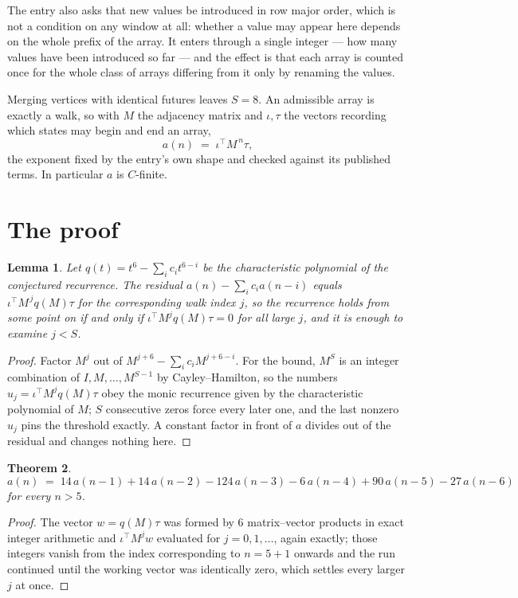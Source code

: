 \documentclass[11pt,a4paper]{article}
\theoremstyle{plain}
\newtheorem{theorem}{Theorem}
\newtheorem{lemma}[theorem]{Lemma}
\theoremstyle{definition}
\begin{document}
The entry also asks that new values be introduced in row major order, which is not a condition on any window at all: whether a value may appear here depends on the whole prefix of the array. It enters through a single integer --- how many values have been introduced so far --- and the effect is that each array is counted once for the whole class of arrays differing from it only by renaming the values.

Merging vertices with identical futures leaves $S=8$. An admissible array is exactly a walk, so with $M$ the adjacency matrix and $\iota,\tau$ the vectors recording which states may begin and end an array,
\[
a(n)\;=\;\iota^{\!\top}M^{\,n}\tau ,
\]
the exponent fixed by the entry's own shape and checked against its published terms. In
particular $a$ is $C$-finite.

\section{The proof}

\begin{lemma}\label{lem:crit}
Let $q(t)=t^{6}-\sum_i c_it^{6-i}$ be the characteristic polynomial of the
conjectured recurrence. The residual $a(n)-\sum_ic_ia(n-i)$ equals
$\iota^{\!\top}M^{\,j}q(M)\tau$ for the corresponding walk index $j$, so the recurrence
holds from some point on if and only if $\iota^{\!\top}M^{j}q(M)\tau=0$ for all large $j$,
and it is enough to examine $j<S$.
\end{lemma}

\begin{proof}
Factor $M^{j}$ out of $M^{j+6}-\sum_ic_iM^{j+6-i}$. For the bound, $M^{S}$
is an integer combination of $I,M,\dots,M^{S-1}$ by Cayley--Hamilton, so the numbers
$u_j=\iota^{\!\top}M^{j}q(M)\tau$ obey the monic recurrence given by the characteristic
polynomial of $M$; $S$ consecutive zeros force every later one, and the last nonzero $u_j$
pins the threshold exactly. A constant factor in front of $a$ divides out of the residual and
changes nothing here.
\end{proof}

\begin{theorem}
\[
a(n)\;=\;14\,a(n-1) + 14\,a(n-2) - 124\,a(n-3) - 6\,a(n-4) + 90\,a(n-5) - 27\,a(n-6)
\]
for every $n>5$.
\end{theorem}

\begin{proof}
The vector $w=q(M)\tau$ was formed by $6$ matrix--vector products in exact integer
arithmetic and $\iota^{\!\top}M^{j}w$ evaluated for $j=0,1,\dots$, again exactly; those
integers vanish from the index corresponding to $n=5+1$ onwards and the run continued
until the working vector was identically zero, which settles every larger $j$ at once.
\end{proof}
\end{document}
